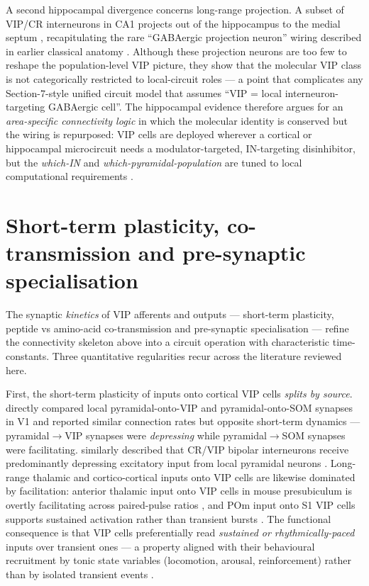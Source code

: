 \documentclass[11pt]{article}
\let\origrightarrow\rightarrow
\def\rightarrow{\ensuremath{\origrightarrow}}
\begin{document}
A second hippocampal divergence concerns long-range projection. A subset of VIP/CR interneurons in CA1 projects out of the hippocampus to the medial septum \citep{Booker2018}, recapitulating the rare ``GABAergic projection neuron'' wiring described in earlier classical anatomy \citep{Booker2018}. Although these projection neurons are too few to reshape the population-level VIP picture, they show that the molecular VIP class is not categorically restricted to local-circuit roles --- a point that complicates any Section-7-style unified circuit model that assumes ``VIP = local interneuron-targeting GABAergic cell''. The hippocampal evidence therefore argues for an \textit{area-specific connectivity logic} in which the molecular identity is conserved but the wiring is repurposed: VIP cells are deployed wherever a cortical or hippocampal microcircuit needs a modulator-targeted, IN-targeting disinhibitor, but the \textit{which-IN} and \textit{which-pyramidal-population} are tuned to local computational requirements \citep{Tyan2014, Turi2019, Francavilla2018a, Booker2018, Bilash2023, Tamboli2024, Toth1993}.

\section{Short-term plasticity, co-transmission and pre-synaptic specialisation}

The synaptic \textit{kinetics} of VIP afferents and outputs --- short-term plasticity, peptide vs amino-acid co-transmission and pre-synaptic specialisation --- refine the connectivity skeleton above into a circuit operation with characteristic time-constants. Three quantitative regularities recur across the literature reviewed here.

First, the short-term plasticity of inputs onto cortical VIP cells \textit{splits by source}. \citet{Karnani2016a} directly compared local pyramidal-onto-VIP and pyramidal-onto-SOM synapses in V1 and reported similar connection rates but opposite short-term dynamics --- pyramidal\rightarrow VIP synapses were \textit{depressing} while pyramidal\rightarrow SOM synapses were facilitating. \citet{Cauli2014} similarly described that CR/VIP bipolar interneurons receive predominantly depressing excitatory input from local pyramidal neurons \citep{Karnani2016a, Cauli2014, Walker2016, Pronneke2019}. Long-range thalamic and cortico-cortical inputs onto VIP cells are likewise dominated by facilitation: anterior thalamic input onto VIP cells in mouse presubiculum is overtly facilitating across paired-pulse ratios \citep{Nassar2025}, and POm input onto S1 VIP cells supports sustained activation rather than transient bursts \citep{Williams2019, Anastasiades2021a}. The functional consequence is that VIP cells preferentially read \textit{sustained or rhythmically-paced} inputs over transient ones --- a property aligned with their behavioural recruitment by tonic state variables (locomotion, arousal, reinforcement) rather than by isolated transient events \citep{Fu2014, Pakan2016, Sabri2024}.
\end{document}
